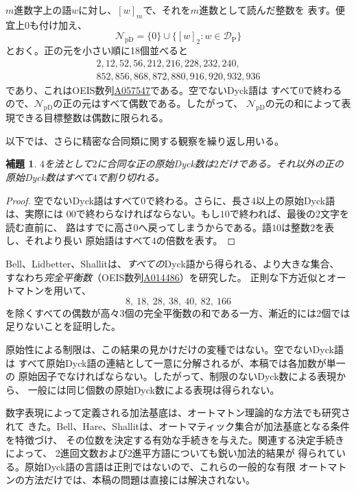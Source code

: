 \documentclass[12pt]{ltjsarticle}
\theoremstyle{plain}
\newtheorem{lemma}[theorem]{補題}
\newcommand{\val}[2]{[#1]_{#2}}
\newcommand{\NpD}{\mathcal{N}_{\mathrm{pD}}}
\newcommand{\DP}{\mathcal{D}_{\mathrm{P}}}
\newcommand{\seqnum}[1]{\href{https://oeis.org/#1}{\textnormal{\underline{#1}}}}
\begin{document}
$m$進数字上の語$w$に対し、$\val{w}{m}$で、それを$m$進数として読んだ整数を
表す。便宜上$0$も付け加え、
\[
 \NpD=\{0\}\cup\{\val{w}{2}:w\in\DP\}
\]
とおく。正の元を小さい順に18個並べると
\[
\begin{gathered}
2,12,52,56,212,216,228,232,240,\\
852,856,868,872,880,916,920,932,936
\end{gathered}
\]
であり、これはOEIS数列\seqnum{A057547}である\cite{OEIS}。空でないDyck語は
すべて$0$で終わるので、$\NpD$の正の元はすべて偶数である。したがって、
$\NpD$の元の和によって表現できる目標整数は偶数に限られる。

以下では、さらに精密な合同類に関する観察を繰り返し用いる。

\begin{lemma}\label{lem:mod4}
$4$を法として$2$に合同な正の原始Dyck数は$2$だけである。それ以外の正の
原始Dyck数はすべて$4$で割り切れる。
\end{lemma}

\begin{proof}
空でないDyck語はすべて$0$で終わる。さらに、長さ4以上の原始Dyck語は、実際には
$00$で終わらなければならない。もし$10$で終われば、最後の2文字を読む直前に、
路はすでに高さ0へ戻ってしまうからである。語$10$は整数$2$を表し、それより長い
原始語はすべて$4$の倍数を表す。
\end{proof}

Bell、Lidbetter、Shallitは、\emph{すべての}Dyck語から得られる、より大きな集合、
すなわち\emph{完全平衡数}（OEIS数列\seqnum{A014486}\cite{OEIS}）を研究した。
正則な下方近似とオートマトンを用いて、
\[
        8,\ 18,\ 28,\ 38,\ 40,\ 82,\ 166
\]
を除くすべての偶数が高々3個の完全平衡数の和である一方、漸近的には2個では
足りないことを証明した\cite[Thm.\ 14]{BLS}。

原始性による制限は、この結果の見かけだけの変種ではない。空でないDyck語は
すべて原始Dyck語の連結として一意に分解されるが、本稿では各加数が単一の
原始因子でなければならない。したがって、制限のないDyck数による表現から、
一般には同じ個数の原始Dyck数による表現は得られない。

数字表現によって定義される加法基底は、オートマトン理論的な方法でも研究されて
きた。Bell、Hare、Shallitは、オートマティック集合が加法基底となる条件を特徴づけ、
その位数を決定する有効な手続きを与えた\cite{BHS}。関連する決定手続きによって、
2進回文数\cite{RSS}および2進平方語\cite{MNRS}についても鋭い加法的結果が
得られている。原始Dyck語の言語は正則ではないので、これらの一般的な有限
オートマトンの方法だけでは、本稿の問題は直接には解決されない。
\end{document}
